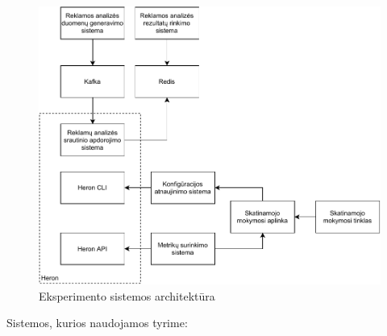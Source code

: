 \documentclass{VUMIFPSbakalaurinis}
\begin{document}
\begin{figure}[H]
    \includegraphics[width=16cm]{img/Experiment.pdf}
    \caption{Eksperimento sistemos architektūra}
    \label{experiment}
\end{figure} 
\pagebreak
Sistemos, kurios naudojamos tyrime:
\end{document}
